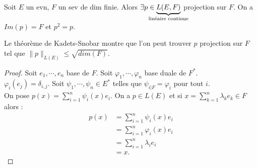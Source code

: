 \begin{corollaire}
    Soit $E$ un evn, $F$ un sev de dim finie. Alors $\exists p\in \underbrace{L(E,F)}_{\mathclap{\text{linéaire continue}}} $ projection sur $F.$ On a $Im(p)=F$ et $p^2=p$.
\end{corollaire}
\begin{remarque}
    Le théorème de Kadets-Snobar montre que l'on peut trouver $p$ projection sur $F$ tel que $\|p\|_{L(E)}\le \sqrt{dim(F)}.$
\end{remarque}
\begin{proof}
    Soit $e_1,\cdots, e_n$ base de $F.$ Soit $\varphi _1,\cdots, \varphi _n$ base duale de $F^*.$ \\
    $\varphi _i(e_j)=\delta_{i,j}.$ Soit $\psi_1,\cdots, \psi_n\in E^*$ telles que $\psi_{i|F}=\varphi _i$ pour tout $i.$ \\
    On pose $p(x)=\sum\limits_{i=1}^{n} \psi_i(x)e_i.$ On a $p\in L(E)$ et si $x=\sum\limits_{k=1}^{n} \lambda_ke_k\in F$ alors :
     \begin{align*}
         p(x)&=\sum\limits_{i=1}^{n} \psi_i(x)e_i\\
             &=\sum\limits_{i=1}^{n} \varphi _i(x)e_i\\
             &=\sum\limits_{i=1}^{n} \lambda_ie_i\\
             &=x.
    \end{align*}
\end{proof}

